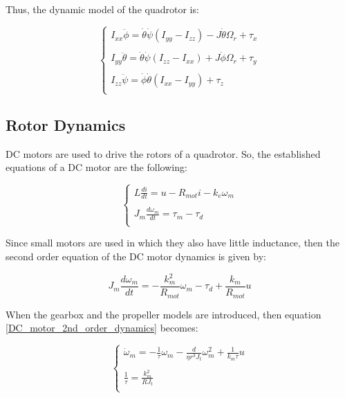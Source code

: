 \documentclass{thesisreport}
\begin{document}
 Thus, the dynamic model of the quadrotor is:
 
 \begin{equation}\label{dynamic_model}
 	\begin{cases}
 		I_{xx}\ddot{\phi}= \dot{\theta}\dot{\psi}(I_{yy}-I_{zz})-J \dot{\theta} \Omega_r + \tau_x \\
 		\\
 		I_{yy}\ddot{\theta}= \dot{\theta}\dot{\psi}(I_{zz}-I_{xx})+J \dot{\phi} \Omega_r + \tau_y \\
 		\\
 		I_{zz}\ddot{\psi}= \dot{\phi}\dot{\theta}(I_{xx}-I_{yy}) + \tau_z \\	
 	\end{cases}
 \end{equation}

 
 
 \newpage
 
 \subsection{Rotor Dynamics}
 
 DC motors are used to drive the rotors of a quadrotor. So, the established equations of a DC motor are the following:

\begin{equation}\label{DC_motor_dynamics}
\begin{cases}
L \frac{di}{dt}=u - R_{mot}i - k_e \omega_m\\
\\
J_m \frac{d \omega_m}{dt} = \tau_m - \tau_d \\
\end{cases}
\end{equation} 

Since small motors are used in which they also have little inductance, then the second order equation of the DC motor dynamics is given by:

\begin{equation}\label{DC_motor_2nd_order_dynamics}
	J_m \frac{d\omega_m}{dt} = -\frac{k_m^2}{R_{mot}}\omega_m - \tau_d + \frac{k_m}{R_{mot}}u
\end{equation}
 
When the gearbox and the propeller models are introduced, then equation \ref{DC_motor_2nd_order_dynamics} becomes:

\begin{equation}\label{DC_motor_2nd_order_dynamics}
\begin{cases}
	\dot{\omega}_m = - \frac{1}{\tau}\omega_m - \frac{d}{\eta r^3 J_t}\omega_m^2 + \frac{1}{k_m \tau}u\\
	\\
	\frac{1}{\tau} = \frac{k_m^2}{RJ_t}\\
	\end{cases}
\end{equation}
 
\end{document}
